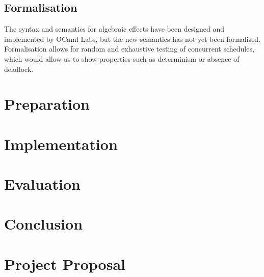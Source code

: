 \documentclass[12pt,a4paper,twoside,openright]{report}
\begin{document}
\section{Formalisation}

The syntax and semantics for algebraic effects have been designed and implemented by OCaml Labs, but the new semantics has not yet been formalised. Formalisation allows for random and exhaustive testing of concurrent schedules, which would allow us to show properties such as determinism or absence of deadlock.

\chapter{Preparation}



\chapter{Implementation}

\chapter{Evaluation}

\chapter{Conclusion}


\appendix

\chapter{Project Proposal}
\end{document}
